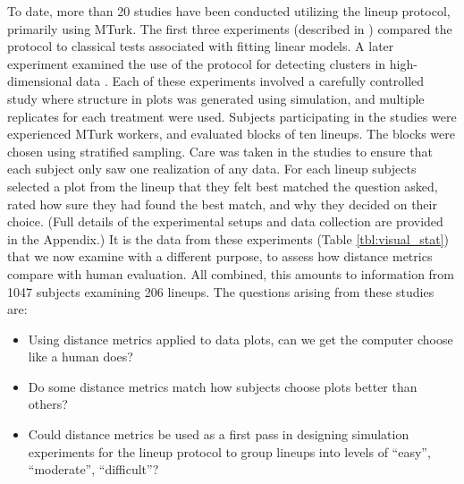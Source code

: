 \documentclass[12pt]{article}\usepackage[]{graphicx}\usepackage[]{color}
\begin{document}
To date, more than 20 studies have been conducted utilizing the lineup protocol, primarily using MTurk. The first three experiments (described in \citet{majumder:2011}) compared the protocol to classical tests associated with fitting linear models. A later experiment examined the use of the protocol for detecting clusters in high-dimensional data \citep{roychowdhury:2013}. Each of these experiments involved a carefully controlled study where structure in plots was generated using simulation, and multiple replicates for each treatment were used. Subjects participating in the studies were experienced MTurk workers, and evaluated blocks of ten lineups. The blocks were chosen using stratified sampling. Care was taken in the studies to ensure that each subject only saw one realization of any data. For each lineup subjects selected a plot from the lineup that they felt best matched the question asked, rated how sure they had found the best match, and why they decided on their choice.  (Full details of the experimental setups and data collection are provided in the Appendix.) It is the data from these experiments (Table \ref{tbl:visual_stat}) that we now examine with a different purpose, to assess how distance metrics compare with human evaluation. All combined, this amounts to information from 1047 subjects examining 206 lineups. The questions arising from these studies are: 

\begin{itemize} \itemsep 0in
  \item Using distance metrics applied to data plots, can we get the computer choose like a human does?
  \item Do some distance metrics match how subjects choose plots better than others?
  \item Could distance metrics be used as a first pass in designing simulation experiments for the lineup protocol to group lineups into levels of ``easy'', ``moderate'', ``difficult''?
\end{itemize}
\end{document}
